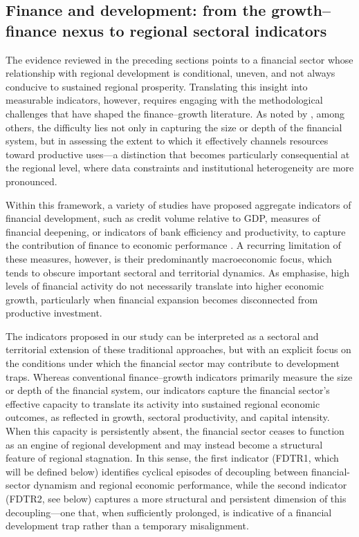 \documentclass[a4paper,11pt,oneside]{article}
\begin{document}
\subsection{Finance and development: from the growth–finance nexus to regional sectoral indicators}



The evidence reviewed in the preceding sections points to a financial sector whose relationship with regional development is conditional, uneven, and not always conducive to sustained regional prosperity. Translating this insight into measurable indicators, however, requires engaging with the methodological challenges that have shaped the finance–growth literature. As noted by \cite{levine2005finance}, among others, the difficulty lies not only in capturing the size or depth of the financial system, but in assessing the extent to which it effectively channels resources toward productive uses---a distinction that becomes particularly consequential at the regional level, where data constraints and institutional heterogeneity are more pronounced.



Within this framework, a variety of studies have proposed aggregate indicators of financial development, such as credit volume relative to GDP, measures of financial deepening, or indicators of bank efficiency and productivity, to capture the contribution of finance to economic performance \citep{beck2000finance,beck2007finance,philippon2015has}. A recurring limitation of these measures, however, is their predominantly macroeconomic focus, which tends to obscure important sectoral and territorial dynamics. As \citet{arcand2015too} emphasise, high levels of financial activity do not necessarily translate into higher economic growth, particularly when financial expansion becomes disconnected from productive investment.




The indicators proposed in our study can be interpreted as a sectoral and territorial extension of these traditional approaches, but with an explicit focus on the conditions under which the financial sector may contribute to development traps. Whereas conventional finance–growth indicators primarily measure the size or depth of the financial system, our indicators capture the financial sector's effective capacity to translate its activity into sustained regional economic outcomes, as reflected in growth, sectoral productivity, and capital intensity. When this capacity is persistently absent, the financial sector ceases to function as an engine of regional development and may instead become a structural feature of regional stagnation. In this sense, the first indicator (FDTR1, which will be defined below) identifies cyclical episodes of decoupling between financial-sector dynamism and regional economic performance, while the second indicator (FDTR2, see below) captures a more structural and persistent dimension of this decoupling---one that, when sufficiently prolonged, is indicative of a financial development trap rather than a temporary misalignment.
\end{document}
